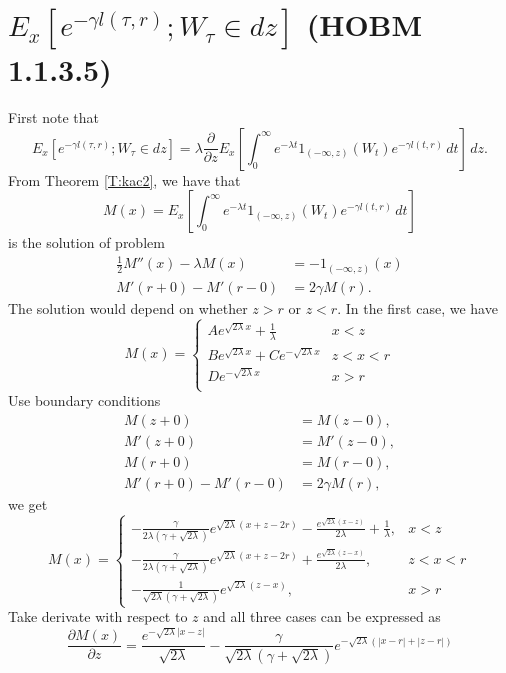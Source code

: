 \section{ $E_x[ e^{-\gamma l(\tau,r)}; W_{\tau}\in dz ]$ (HOBM 1.1.3.5)}
First note that 
\[
  E_x[ e^{-\gamma l(\tau,r)}; W_{\tau}\in dz ]
    = \lambda \frac{\partial}{\partial z} E_x 
       \left[
         \int_0^{\infty} e^{-\lambda t} 1_{(-\infty,z)}(W_t)
           e^{-\gamma l(t,r)} \, dt
       \right]
      \, dz.
\]
From Theorem \ref{T:kac2}, we have that 
\[
  M(x) = E_x 
    \left[
      \int_0^{\infty} e^{-\lambda t} 1_{(-\infty,z)}(W_t)
           e^{-\gamma l(t,r)} \, dt
    \right]
\]
is the solution of problem
\begin{align*}
  \frac{1}{2} M''(x) - \lambda M(x) &= - 1_{(-\infty,z)}(x) \\
  M'(r+0) - M'(r-0) &= 2\gamma M(r).
\end{align*}
The solution would depend on whether $z>r$ or $z<r$. In the first case, we have
\[
  M(x)= 
    \begin{cases}
      A e^{\sqrt{2\lambda} x} + \frac{1}{\lambda} &x<z  \\
      B e^{\sqrt{2\lambda} x} + C e^{-\sqrt{2\lambda} x}  &z<x<r   \\
      D e^{-\sqrt{2\lambda} x}  &x>r  \\
    \end{cases}
\]
Use boundary conditions
\begin{align*}
  M(z+0) &= M(z-0),  \\
  M'(z+0) &= M'(z-0), \\
  M(r+0) &= M(r-0), \\
  M'(r+0) - M'(r-0) &= 2\gamma M(r),
\end{align*}
we get
\[
  M(x)= 
    \begin{cases}
      -\frac{\gamma}{2\lambda(\gamma+\sqrt{2\lambda})}
        e^{\sqrt{2\lambda}(x+z-2r)} - \frac{e^{\sqrt{2\lambda}(x-z)}}{2\lambda}
        + \frac{1}{\lambda},
      &x<z \\
      -\frac{\gamma}{2\lambda(\gamma+\sqrt{2\lambda})}
        e^{\sqrt{2\lambda}(x+z-2r)} + \frac{e^{\sqrt{2\lambda}(z-x)}}{2\lambda},
      &z<x<r \\
      -\frac{1}{\sqrt{2\lambda} (\gamma+\sqrt{2\lambda})}
        e^{\sqrt{2\lambda} (z-x)},  &x>r
    \end{cases}
\]
Take derivate with respect to $z$ and all three cases can be expressed as
\[
  \frac{\partial M(x)}{\partial z} 
    = \frac{e^{-\sqrt{2\lambda} |x-z|} }{\sqrt{2\lambda}}
      - \frac{\gamma}{\sqrt{2\lambda} (\gamma+\sqrt{2\lambda})}
        e^{ -\sqrt{2\lambda} (|x-r|+|z-r|) }
\]

